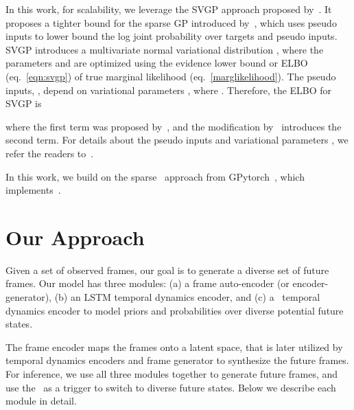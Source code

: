 \documentclass{article} \usepackage{iclr2021_conference,times}
\newcommand{\GP}{}
\begin{document}
In this work, for scalability, we leverage the SVGP approach proposed by~\citet{hensman2013gaussian}. It proposes a tighter bound for the sparse GP introduced by~\citet{pmlr-v5-titsias09a}, which uses pseudo inputs  to lower bound the log joint probability over targets and pseudo inputs. SVGP introduces a multivariate normal variational distribution , where the parameters  and  are optimized using the evidence lower bound or ELBO (eq.~\ref{eqn:svgp}) of true marginal likelihood (eq.~\ref{marglikelihood}). The pseudo inputs, , depend on variational parameters , where . Therefore, the ELBO for SVGP is

where the first term was proposed by~\citet{pmlr-v5-titsias09a}, and the modification by~\citet{hensman2013gaussian} introduces the second term. For details about the pseudo inputs  and variational parameters , we refer the readers to~\citep{pmlr-v5-titsias09a,hensman2013gaussian}. 

In this work, we build on the sparse \GP\ approach from GPytorch~\citep{gardner2018gpytorch}, which implements~\citep{hensman2013gaussian}.


\section{Our Approach}
\label{sec:approach}
Given a set of observed frames, our goal is to generate a diverse set of future frames. Our model has three modules: (a) a frame auto-encoder (or encoder-generator), (b) an LSTM temporal dynamics encoder, and (c) a \GP\ temporal dynamics encoder to model priors and probabilities over diverse potential future states.

The frame encoder maps the frames onto a latent space, that is later utilized by temporal dynamics encoders and frame generator to synthesize the future frames. For inference, we use all three modules together to generate future frames, and use the \GP\ as a trigger to switch to diverse future states. Below we describe each module in detail.

\vspace{-0.05in}
\end{document}
